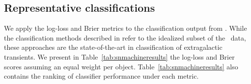


\subsection{Representative classifications}
\label{sec:realresults}
We apply the log-loss and Brier metrics to the classification output from \snmachine. While the classification methods described in \citet{lochner_photometric_2016} refer to the idealized subset of the \snphotcc\ data, these approaches are the state-of-the-art in classification of extragalactic transients. We present in Table~\ref{tab:snmachineresults} the log-loss and Brier scores assuming an equal weight per object.
Table~\ref{tab:snmachineresults} also contains the ranking of classifier performance under each metric.


